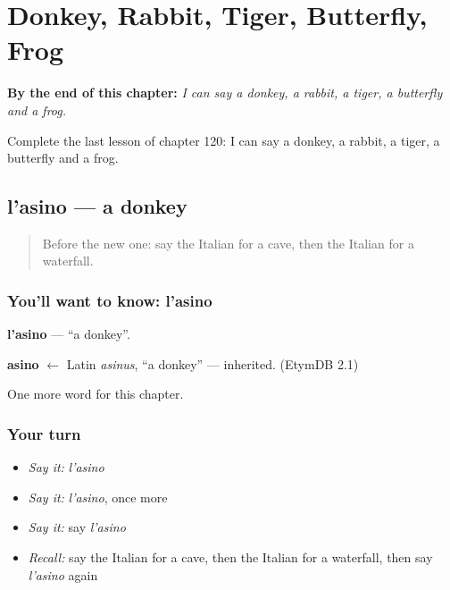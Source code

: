 
\chapter{Donkey, Rabbit, Tiger, Butterfly, Frog}
\label{ch:it-donkey-rabbit-tiger-butterfly-frog}

\begin{chapteropening}
\textbf{By the end of this chapter:} \emph{I can say a donkey, a rabbit, a tiger, a butterfly and a frog.}

Complete the last lesson of chapter 120: I can say a donkey, a rabbit, a tiger, a butterfly and a frog.
\end{chapteropening}

\section[l'asino]{l'asino — a donkey}

\label{lesson:IT-C120-asino}



\begin{quote}
Before the new one: say the Italian for a cave, then the Italian for a waterfall.
\end{quote}

\subsection*{You'll want to know: l'asino}
\textbf{l'asino} — \textquotedblleft{}a donkey\textquotedblright{}.

\begin{cousinweb}
\textbf{asino} $\leftarrow$ Latin \emph{asinus}, \textquotedblleft{}a donkey\textquotedblright{} — inherited. (EtymDB 2.1)
\end{cousinweb}

\begin{grammarlens}[title={What you've built}]
One more word for this chapter.
\end{grammarlens}

\subsection*{Your turn}
\begin{itemize}
\raggedright
  \item \emph{Say it:} \emph{l'asino}
  \item \emph{Say it:} \emph{l'asino}, once more
  \item \emph{Say it:} say \emph{l'asino}
  \item \emph{Recall:} say the Italian for a cave, then the Italian for a waterfall, then say \emph{l'asino} again
\end{itemize}

